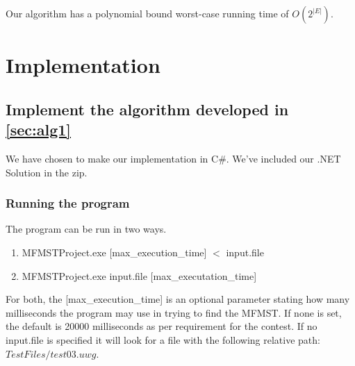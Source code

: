 \documentclass[12pt]{report}
\begin{document}
Our algorithm has a polynomial bound worst-case running time of $O(2^{|E|})$.

\chapter{Implementation}
\section{Implement the algorithm developed in \ref{sec:alg1}}
We have chosen to make our implementation in C\#. We've included our .NET Solution in the zip.
\subsection{Running the program}
The program can be run in two ways.
\begin{enumerate}
	\item MFMSTProject.exe [max\_execution\_time] $<$ input.file
	\item MFMSTProject.exe input.file [max\_executation\_time]
\end{enumerate}

For both, the [max\_execution\_time] is an optional parameter stating how many milliseconds the program may use in trying to find the MFMST. If none is set, the default is 20000 milliseconds as per requirement for the contest. If no input.file is specified it will look for a file with the following relative path: $TestFiles/test03.uwg$.
\newpage
\end{document}
